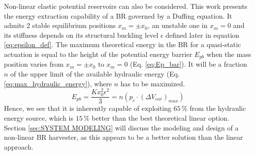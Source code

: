 \documentclass[3p,twocolumn,preprint]{elsarticle}
\begin{document}
Non-linear elastic potential reservoirs can also be considered. This work presents the energy extraction capability of a BR governed by a Duffing equation. It admits 2 stable equilibrium positions \mbox{$x_m=\pm x_0$}, an unstable one in \mbox{$x_m=0$} and its stiffness depends on its structural buckling level $\epsilon$ defined later in equation \ref{eq:epsilon_def}. The maximum theoretical energy in the BR for a quasi-static actuation is equal to the height of the potential energy barrier $E_{pb}$ when the mass position varies from \mbox{$x_m=\pm x_0$} to \mbox{$x_m=0$} (Eq. \ref{eq:Ep_bar}). It will be a fraction $n$ of the upper limit of the available hydraulic energy (Eq. \ref{eq:max_hydraulic_energy}), where $n$ has to be maximized. 
\begin{equation}
	E_{pb} = \dfrac{K x_0^2\epsilon^2}{3} = n(p_c \cdot (\Delta V_{ear})_{max})
	\label{eq:Ep_bar}
\end{equation}
Hence, we see that it is inherently capable of exploiting $65$\,\% from the hydraulic energy source, which is $15$\,\% better than the best theoretical linear option. Section \ref{sec:SYSTEM MODELING} will discuss the modeling and design of a non-linear BR harvester, as this appears to be a better solution than the linear approach. 
\end{document}

